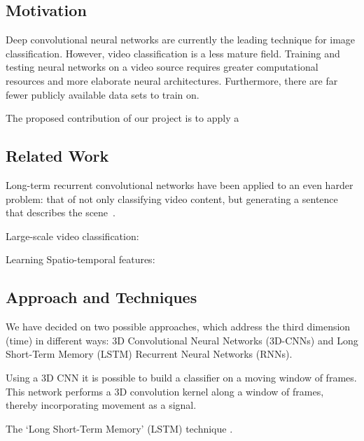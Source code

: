 \subsection{Motivation}
Deep convolutional neural networks are currently the leading technique for image classification. However, video classification is a less mature field. Training and testing neural networks on a video source requires greater computational resources and more elaborate neural architectures. Furthermore, there are far fewer publicly available data sets to train on. 

The proposed contribution of our project is to apply a 
\subsection{Related Work}

Long-term recurrent convolutional networks have been applied to an even harder problem: that of not only classifying video content, but generating a sentence that describes the scene~\cite{ltrcn}.

Large-scale video classification:~\cite{cnnvid}

Learning Spatio-temporal features:~\cite{stf}
\subsection{Approach and Techniques}
We have decided on two possible approaches, which address the third dimension (time) in different ways: 3D Convolutional Neural Networks (3D-CNNs) and Long Short-Term Memory (LSTM) Recurrent Neural Networks (RNNs). 

Using a 3D CNN it is possible to build a classifier on a moving window of frames. This network performs a 3D convolution kernel along a window of frames, thereby incorporating movement as a signal.

The `Long Short-Term Memory' (LSTM) technique \TODO{\dots}.
